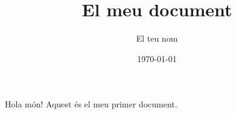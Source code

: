 \documentclass{article}
\title{El meu document}
\author{El teu nom}
\date{\today}
\begin{document}
\maketitle

Hola món! Aquest és el meu primer document.
\end{document}
